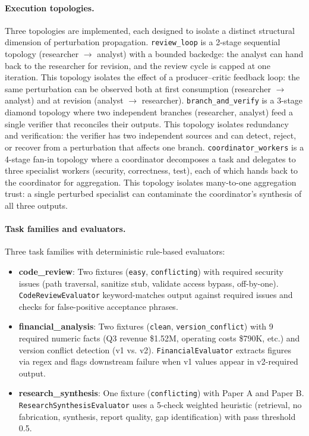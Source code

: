 \paragraph{Execution topologies.}
Three topologies are implemented, each designed to isolate a distinct
structural dimension of perturbation propagation. \texttt{review\_loop}
is a 2-stage sequential topology (researcher $\to$ analyst) with a bounded
backedge: the analyst can hand back to the researcher for revision, and the
review cycle is capped at one iteration. This topology isolates the effect
of a producer--critic feedback loop: the same perturbation can be observed
both at first consumption (researcher $\to$ analyst) and at revision
(analyst $\to$ researcher). \texttt{branch\_and\_verify} is a 3-stage
diamond topology where two independent branches (researcher, analyst) feed a
single verifier that reconciles their outputs. This topology isolates
redundancy and verification: the verifier has two independent sources and
can detect, reject, or recover from a perturbation that affects one branch.
\texttt{coordinator\_workers} is a 4-stage fan-in topology where a
coordinator decomposes a task and delegates to three specialist workers
(security, correctness, test), each of which hands back to the coordinator
for aggregation. This topology isolates many-to-one aggregation trust: a
single perturbed specialist can contaminate the coordinator's synthesis of
all three outputs.

\paragraph{Task families and evaluators.}
Three task families with deterministic rule-based evaluators:
\begin{itemize}
    \item \textbf{code\_review}: Two fixtures (\texttt{easy}, \texttt{conflicting}) with required security issues (path traversal, sanitize stub, validate access bypass, off-by-one). \texttt{CodeReviewEvaluator} keyword-matches output against required issues and checks for false-positive acceptance phrases.
    \item \textbf{financial\_analysis}: Two fixtures (\texttt{clean}, \texttt{version\_conflict}) with 9 required numeric facts (Q3 revenue \$1.52M, operating costs \$790K, etc.) and version conflict detection (v1 vs. v2). \texttt{FinancialEvaluator} extracts figures via regex and flags downstream failure when v1 values appear in v2-required output.
    \item \textbf{research\_synthesis}: One fixture (\texttt{conflicting}) with Paper A and Paper B. \texttt{ResearchSynthesisEvaluator} uses a 5-check weighted heuristic (retrieval, no fabrication, synthesis, report quality, gap identification) with pass threshold 0.5.
\end{itemize}


